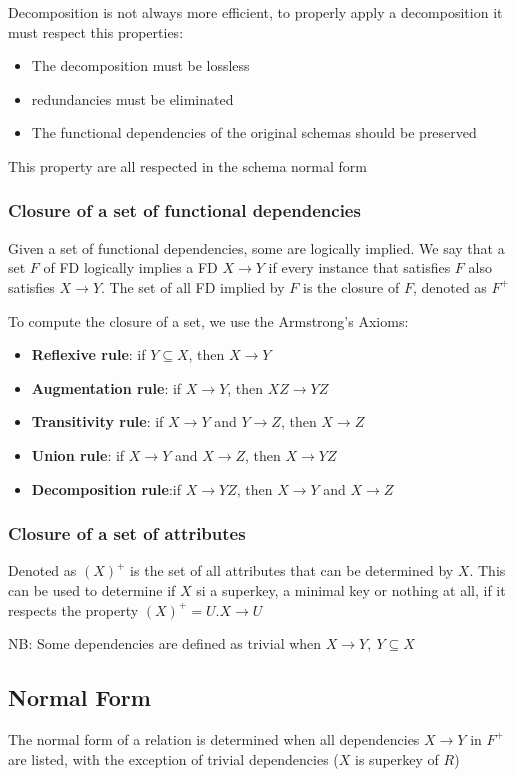 \documentclass[12pt, a4paper]{article}
\begin{document}
Decomposition is not always more efficient, to properly apply a decomposition it must respect this properties:
\begin{itemize}
    \item The decomposition must be lossless
    \item redundancies must be eliminated
    \item The functional dependencies of the original schemas should be preserved
\end{itemize}

This property are all respected in the schema normal form

\subsubsection*{Closure of a set of functional dependencies}
Given a set of functional dependencies, some are logically implied. We say that a set $F$ of FD logically implies 
a FD $X\to Y$ if every instance that satisfies $F$ also satisfies $X\to Y$. The set of all FD implied by $F$ is the
closure of $F$, denoted as $F^{+}$

To compute the closure of a set, we use the Armstrong's Axioms:
\begin{itemize}
    \item \textbf{Reflexive rule}: if $Y\subseteq X$, then $X\to Y$
    \item \textbf{Augmentation rule}: if $X\to Y$, then $XZ\to YZ$
    \item \textbf{Transitivity rule}: if $X\to Y$ and $Y\to Z$, then $X\to Z$
    \item \textbf{Union rule}: if $X\to Y$ and $X\to Z$, then $X\to YZ$
    \item \textbf{Decomposition rule}:if $X\to YZ$, then $X\to Y$ and $X\to Z$
\end{itemize}

\subsubsection*{Closure of a set of attributes}
Denoted as $(X)^{+}$ is the set of all attributes that can be determined by $X$. This can be used to determine
if $X$ si a superkey, a minimal key or nothing at all, if it respects the property $(X)^{+}=U.X \to U$

NB: Some dependencies are defined as trivial when $X\to Y,\ Y\subseteq X$

\subsection{Normal Form}
The normal form of a relation is determined when all dependencies $X\to Y$ in $F^{+}$ are listed, with the exception
of trivial dependencies ($X$ is superkey of $R$)
\end{document}
